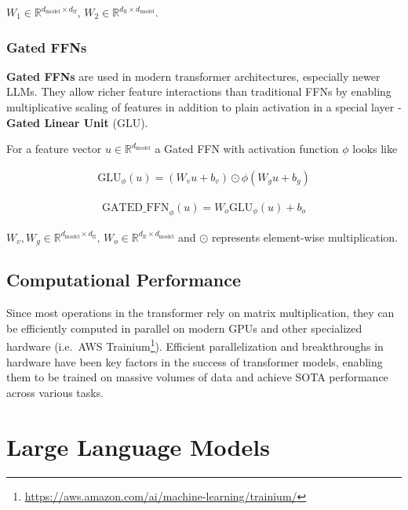 \noindent $W_1 \in \mathbb{R}^{d_{\mathrm{model}} \times d_{\mathrm{ff}}}, \, W_2 \in \mathbb{R}^{d_{\mathrm{ff}} \times d_{\mathrm{model}}}$.

\subsubsection{Gated FFNs}

\textbf{Gated FFNs} are used in modern transformer architectures, especially newer LLMs.
They allow richer feature interactions than traditional FFNs by enabling multiplicative scaling of features in addition to plain activation in a special layer - \textbf{Gated Linear Unit} (GLU). \parencite{Dauphin2017}

\bigskip

\noindent For a feature vector $u \in \mathbb{R}^{d_{\mathrm{model}}}$ a Gated FFN with activation function $\phi$ looks like

\begin{align}
    \mathrm{GLU}_{\phi}(u) = (W_v u + b_v) \odot \phi(W_g u + b_g)
\end{align}


\begin{align}
    \mathrm{GATED\_FFN}_{\phi}(u) = W_o \mathrm{GLU}_{\phi}(u) + b_o
\end{align}

\smallskip

\noindent $W_v, W_g \in \mathbb{R}^{d_{\mathrm{model}} \times d_{\mathrm{ff}}}, \, W_o \in \mathbb{R}^{d_{\mathrm{ff}} \times d_{\mathrm{model}}}$  and $\odot$ represents element-wise multiplication.

\subsection{Computational Performance}
Since most operations in the transformer rely on matrix multiplication, they can be efficiently computed in parallel on modern GPUs and other specialized hardware (i.e.\ AWS Trainium\footnote{\url{https://aws.amazon.com/ai/machine-learning/trainium/}}).
Efficient parallelization and breakthroughs in hardware have been key factors in the success of transformer models, enabling them to be trained on massive volumes of data and achieve SOTA performance across various tasks.


\section{Large Language Models}

